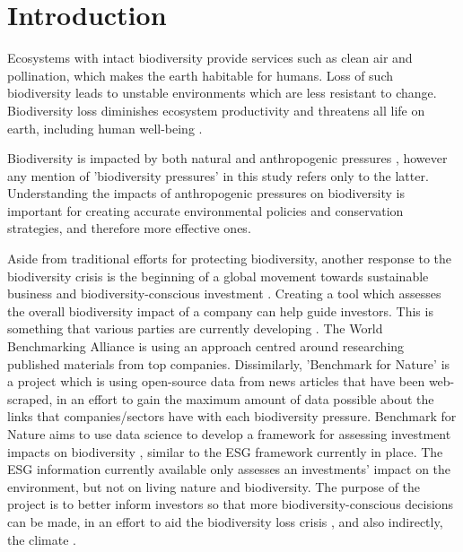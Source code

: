 \documentclass[11pt, a4paper, titlepage]{article}
\begin{document}
	\tableofcontents
	
	\newpage
	
    \section*{Introduction}
    	
   	 Ecosystems with intact biodiversity provide services such as clean air and pollination, which makes the earth habitable for humans. Loss of such biodiversity leads to unstable environments which are less resistant to change. Biodiversity loss diminishes ecosystem productivity \citep{duffy2017biodiversity} and threatens all life on earth, including human well-being \citep{diaz2006biodiversity}. \newline
   	 
   	 Biodiversity is impacted by both natural and anthropogenic pressures \citep{nobel2020anthropogenic}, however any mention of 'biodiversity pressures' in this study refers only to the latter. Understanding the impacts of anthropogenic pressures on biodiversity is important for creating accurate environmental policies and conservation strategies, and therefore more effective ones.  \newline
   	 
   	 Aside from traditional efforts for protecting biodiversity, another response to the biodiversity crisis \citep{ogar2020science} is the beginning of a global movement towards sustainable business and biodiversity-conscious investment \citep{pri2020}\citep{worldeconomicforum2020}\citep{wwf2020}. Creating a tool which assesses the overall biodiversity impact of a company can help guide investors. This is something that various parties are currently developing \citep{worldbenchmarkingalliance_2022}\citep{iccs_2020}. The World Benchmarking Alliance is using an approach centred around researching published materials from top companies. Dissimilarly, 'Benchmark for Nature' is a project which is using open-source data from news articles that have been web-scraped, in an effort to gain the maximum amount of data possible about the links that companies/sectors have with each biodiversity pressure. Benchmark for Nature aims to use data science to develop a framework for assessing investment impacts on biodiversity \citep{iccs_2020}, similar to the ESG framework currently in place. The ESG information currently available only assesses an investments' impact on the environment, but not on living nature and biodiversity. The purpose of the project is to better inform investors so that more biodiversity-conscious decisions can be made, in an effort to aid the biodiversity loss crisis \citep{gasu2021review}, and also indirectly, the climate \citep{shin2022actions}.\newline
   	 
\end{document}
